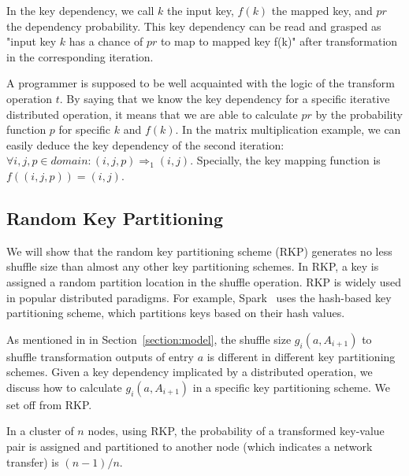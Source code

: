 \documentclass[10pt,journal,compsoc]{IEEEtran}
\begin{document}
In the key dependency, we call $k$ the input key, $f(k)$ the mapped key, 
and $pr$ the dependency probability.
This key dependency can be read and grasped as 
"input key $k$ has a chance of $pr$ to map to mapped key f(k)" after transformation in the corresponding iteration. 

A programmer is supposed to be well acquainted with the logic of the transform operation $t$. 
By saying that we know the key dependency for a specific iterative distributed operation,
it means that we are able to calculate $pr$ by the probability function 
$p$ for specific $k$ and $f(k)$.
In the matrix multiplication example, we can easily deduce
the key dependency of the second iteration: 
$\forall i, j, p \in domain: (i, j, p) \Rightarrow_{1} (i, j)$.  
Specially, the key mapping function is $f((i, j, p)) = (i, j)$.


\subsection{Random Key Partitioning}\label{section:rkp}
We will show that the random key partitioning scheme (RKP) generates no less shuffle size than almost any other key partitioning schemes. 
In RKP, a key is assigned a random partition location in the shuffle operation. 
RKP is widely used in popular distributed paradigms.
For example, Spark~\cite{zaharia2012resilient} uses the hash-based key partitioning scheme, which partitions keys based on their hash values. 

As mentioned in in Section~\ref{section:model}, the shuffle size $g_i(a, A_{i+1})$ to shuffle transformation outputs of entry $a$ is different in different key partitioning schemes. 
Given a key dependency implicated by a distributed operation, we discuss how to calculate $g_i(a, A_{i+1})$ in a specific key partitioning scheme. 
We set off from RKP.


In a cluster of $n$ nodes, using RKP, the probability of a transformed key-value pair 
is assigned and partitioned to another node (which indicates a network transfer) is $(n-1)/n$.
\end{document}
